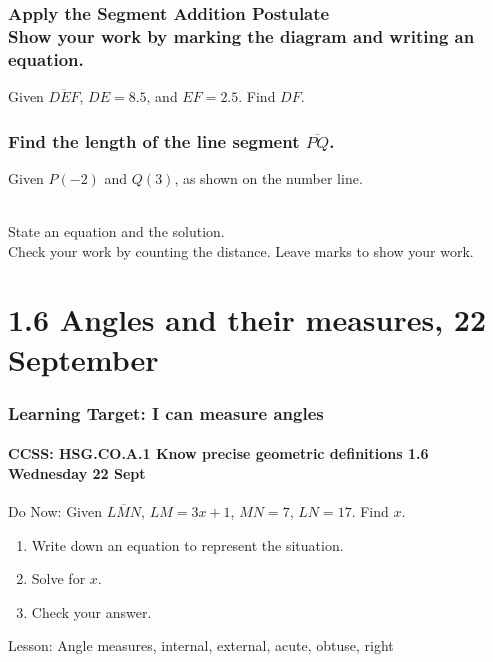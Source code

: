 \documentclass{beamer}
\begin{document}
  \frame
  {
    \frametitle{Apply the Segment Addition Postulate \\
    Show your work by marking the diagram and writing an equation.}
      Given $\overline{DEF}$, $DE=8.5$, and $EF=2.5$. Find ${DF}$.\\[0.75cm]
         \vspace{4cm}
  }

  \frame
  {
    \frametitle{Find the length of the line segment $\overline{PQ}$.}
    Given $P(-2)$ and $Q(3)$, as shown on the number line. \\[0.25cm]
       \\
      State an equation and the solution. \\
  Check your work by counting the distance. Leave marks to show your work. \vspace{5cm}  
  }

\section{1.6 Angles and their measures, 22 September}
\frame
{
  \frametitle{Learning Target: I can measure angles}
  \framesubtitle{CCSS: HSG.CO.A.1 Know precise geometric definitions  \hfill \alert{1.6 Wednesday 22 Sept}}

  \begin{block}{Do Now: Given $\overline{LMN}$, $LM=3x+1$, $MN=7$, $LN=17$. Find ${x}$.}
  \begin{enumerate}
    \item Write down an equation to represent the situation.
    \item Solve for $x$.
    \item Check your answer.
  \end{enumerate}
  \end{block}
  Lesson: Angle measures, internal, external, acute, obtuse, right
}
  
\end{document}
